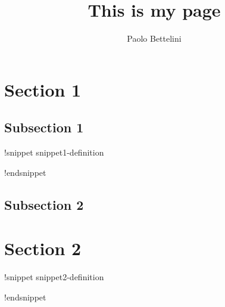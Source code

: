\documentclass[preview]{standalone}
\author{Paolo Bettelini}
\date{}
\begin{document}
\title{This is my page}

\genpage
\gencourse

\section{Section 1}

\subsection{Subsection 1}

!snippet snippet1-definition


!endsnippet

\subsection{Subsection 2}

\section{Section 2}

!snippet snippet2-definition


!endsnippet

\pagebreak
\end{document}
